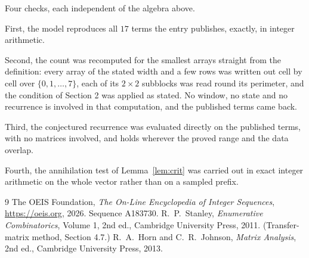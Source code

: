 \documentclass[11pt,a4paper]{article}
\theoremstyle{plain}
\theoremstyle{definition}
\begin{document}
Four checks, each independent of the algebra above.

First, the model reproduces all $17$ terms the entry publishes, exactly, in integer
arithmetic.

Second, the count was recomputed for the smallest arrays straight from the definition: every
array of the stated width and a few rows was written out cell by cell over $\{0,1,\dots,7\}$, each of
its $2\times2$ subblocks was read round its perimeter, and the condition of Section 2 was
applied as stated. No window, no state and no recurrence is involved in that computation, and
the published terms came back.

Third, the conjectured recurrence was evaluated directly on the published terms, with no
matrices involved, and holds wherever the proved range and the data overlap.

Fourth, the annihilation test of Lemma~\ref{lem:crit} was carried out in exact integer
arithmetic on the whole vector rather than on a sampled prefix.

\begin{thebibliography}{9}
 The OEIS Foundation, \emph{The On-Line Encyclopedia of Integer
Sequences}, \url{https://oeis.org}, 2026. Sequence A183730.
 R.~P.~Stanley, \emph{Enumerative Combinatorics}, Volume 1, 2nd ed.,
Cambridge University Press, 2011. (Transfer-matrix method, Section 4.7.)
 R.~A.~Horn and C.~R.~Johnson, \emph{Matrix Analysis}, 2nd ed., Cambridge
University Press, 2013.
\end{thebibliography}
\end{document}

